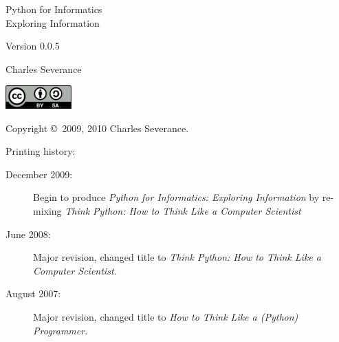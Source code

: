 \documentclass[10pt]{book}
\newcommand{\theversion}{0.0.5}
\begin{document}
\begin{latexonly}

\blankpage
\blankpage

\pagebreak
\thispagestyle{empty}

\begin{flushright}
\vspace*{2.0in}

\begin{spacing}{3}
{\huge Python for Informatics}\\
{\Large Exploring Information}
\end{spacing}

\vspace{0.25in}

Version \theversion

\vspace{0.5in}


{\Large
Charles Severance\\
}


\vspace{2.25in}

\centerline{\includegraphics[width=1in]{figs2/by-sa.eps}}
\vfill

\end{flushright}


\pagebreak
\thispagestyle{empty}

{\small
Copyright \copyright ~2009, 2010 Charles Severance.


Printing history:

\begin{description}

\item[December 2009:] Begin to 
produce 
\emph{Python for Informatics: Exploring Information}
by re-mixing
\emph{Think Python: How to Think Like
a Computer Scientist}

\item[June 2008:] Major revision, changed title to
\emph{Think Python: How to Think Like
a Computer Scientist}.

\item[August 2007:] Major revision, changed title to
\emph{How to Think Like a (Python) Programmer}.


\end{description}}
\end{latexonly}
\end{document}
